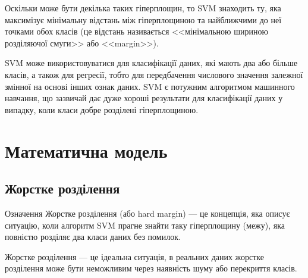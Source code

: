 \documentclass[]{article}
\begin{document}
Оскільки може бути декілька таких гіперплощин, то SVM знаходить ту, яка максимізує мінімальну відстань між гіперплощиною та найближчими до неї точками обох класів (це відстань називається <<мінімальною шириною розділяючої смуги>> або <<margin>>).

SVM може використовуватися для класифікації даних, які мають два або більше класів, а також для регресії, тобто для передбачення числового значення залежної змінної на основі інших ознак даних. SVM є потужним алгоритмом машинного навчання, що зазвичай дає дуже хороші результати для класифікації даних у випадку, коли класи добре розділені гіперплощиною.

\section{Математична модель}

\subsection{Жорстке розділення}

\begin{defbox}{Означення}
Жорстке розділення (або hard margin) --- це концепція, яка описує ситуацію, коли алгоритм SVM прагне знайти таку гіперплощину (межу), яка повністю розділяє два класи даних без помилок.
\end{defbox}

Жорстке розділення --- це ідеальна ситуація, в реальних даних жорстке розділення може бути неможливим через наявність шуму або перекриття класів.
\end{document}
